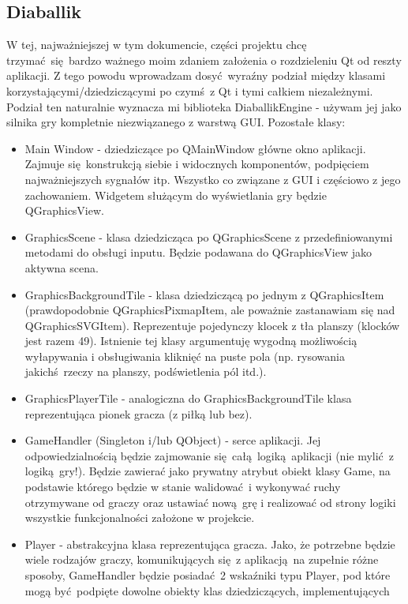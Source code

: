\documentclass[a4paper,12pt]{article}
\begin{document}
\subsection{Diaballik}
W tej, najważniejszej w tym dokumencie, części projektu chcę trzymać się bardzo ważnego moim zdaniem założenia o rozdzieleniu Qt od reszty aplikacji.
Z tego powodu wprowadzam dosyć wyraźny podział między klasami korzystającymi/dziedziczącymi po czymś z Qt i tymi całkiem niezależnymi. Podział ten
naturalnie wyznacza mi biblioteka DiaballikEngine - używam jej jako silnika gry kompletnie niezwiązanego z warstwą GUI. Pozostałe klasy:
\begin{itemize}
 \item Main Window - dziedziczące po QMainWindow główne okno aplikacji. Zajmuje się konstrukcją siebie i widocznych komponentów, podpięciem 
 najważniejszych sygnałów itp. Wszystko co związane z GUI i częściowo z jego zachowaniem. Widgetem służącym do wyświetlania gry będzie QGraphicsView.
 \item GraphicsScene - klasa dziedzicząca po QGraphicsScene z przedefiniowanymi metodami do obsługi inputu. Będzie podawana do QGraphicsView jako
 aktywna scena. 
 \item GraphicsBackgroundTile - klasa dziedziczącą po jednym z QGraphicsItem (prawdopodobnie QGraphicsPixmapItem, ale poważnie zastanawiam się nad
 QGraphicsSVGItem). Reprezentuje pojedynczy klocek z tła planszy (klocków jest razem 49). Istnienie tej klasy argumentuję wygodną możliwością 
 wyłapywania i obsługiwania kliknięć na puste pola (np. rysowania jakichś rzeczy na planszy, podświetlenia pól itd.).
 \item GraphicsPlayerTile - analogiczna do GraphicsBackgroundTile klasa reprezentująca pionek gracza (z piłką lub bez).
 \item GameHandler (Singleton i/lub QObject) - serce aplikacji. Jej odpowiedzialnością będzie zajmowanie się całą logiką aplikacji (nie mylić z 
 logiką gry!). Będzie zawierać jako prywatny atrybut obiekt klasy Game, na podstawie którego będzie w stanie walidować i wykonywać ruchy 
 otrzymywane od graczy oraz ustawiać nową grę i realizować od strony logiki wszystkie funkcjonalności założone w projekcie.
 \item Player - abstrakcyjna klasa reprezentująca gracza. Jako, że potrzebne będzie wiele rodzajów graczy, komunikujących się z aplikacją na zupełnie
 różne sposoby, GameHandler będzie posiadać 2 wskaźniki typu Player, pod które mogą być podpięte dowolne obiekty klas dziedziczących, implementujących

\end{itemize}
\end{document}
